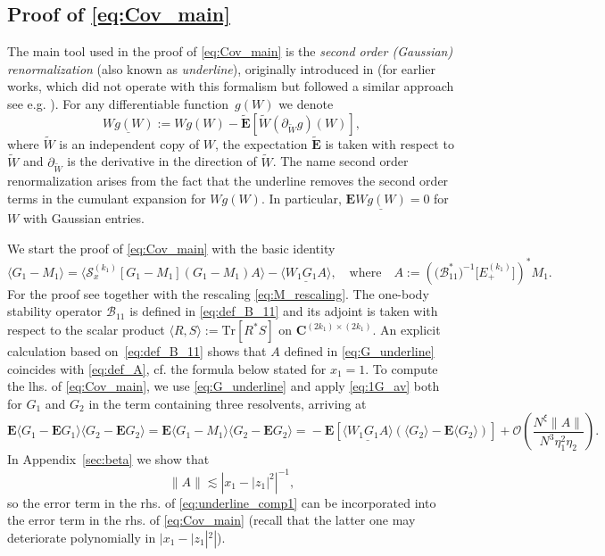 \documentclass[10pt]{amsart}
\numberwithin{equation}{section}
\newcommand{\E}{\mathbf{E}}
\newcommand{\C}{\mathbf{C}}
\begin{document}
\subsection{Proof of \eqref{eq:Cov_main}}\label{sec:Cov_underline}
The main tool used in the proof of \eqref{eq:Cov_main} is the \emph{second order (Gaussian) renormalization} (also known as \emph{underline}), originally introduced in \cite[Eq.(4.2)]{ETH_Wigner} (for earlier works, which did not operate with this formalism but followed a similar approach see e.g. \cite[Eq.(2.5)]{Knowles20}). For any differentiable function~$g(W)$ we denote
\begin{equation}
\underline{Wg(W)}:=Wg(W) - \widetilde{\E}\left[ \widetilde{W}\left(\partial_{\widetilde{W}}g\right)(W)\right],
\label{eq:def_under_1}
\end{equation} 
where $\widetilde{W}$ is an independent copy of $W$, the expectation $\widetilde{\E}$ is taken with respect to $\widetilde{W}$ and $\partial_{\widetilde{W}}$ is the derivative in the direction of $\widetilde{W}$. The name second order renormalization arises from the fact that the underline removes the second order terms in the cumulant expansion for $Wg(W)$. In particular, $\E\underline{Wg(W)}=0$ for $W$ with Gaussian entries.

We start the proof of \eqref{eq:Cov_main} with the basic identity
\begin{equation}
\langle G_1-M_1\rangle = \langle \mathcal{S}^{(k_1)}_x[G_1-M_1](G_1-M_1)A\rangle - \langle \underline{W_1G_1A}\rangle,\quad\text{where}\quad A:=\left(\big(\mathcal{B}_{11}^*\big)^{-1}\big[E_+^{(k_1)}\big]\right)^*M_1.
\label{eq:G_underline}
\end{equation}
For the proof see \cite[Eq.(6.9)]{macroCLT_complex} together with the rescaling \eqref{eq:M_rescaling}. The one-body stability operator $\mathcal{B}_{11}$ is defined in \eqref{eq:def_B_11} and its adjoint is taken with respect to the scalar product $\langle R,S\rangle:=\mathrm{Tr}[R^*S]$ on $\C^{(2k_1)\times (2k_1)}$. An explicit calculation based on~\eqref{eq:def_B_11} shows that $A$ defined in \eqref{eq:G_underline} coincides with \eqref{eq:def_A}, cf. the formula below \cite[Eq.(3.39)]{hyperuniformity} stated for $x_1=1$. To compute the lhs. of \eqref{eq:Cov_main}, we use \eqref{eq:G_underline} and apply \eqref{eq:1G_av} both for $G_1$ and $G_2$ in the term containing three resolvents, arriving at
\begin{equation}
\E \langle G_1-\E G_1\rangle \langle G_2-\E G_2\rangle\!=\! \E \langle G_1-M_1\rangle \langle G_2-\E G_2\rangle\!=\! -\E\left[\langle\underline{W_1G_1A}\rangle \left(\langle G_2\rangle -\E \langle G_2\rangle\right)\right] + \mathcal{O} \left(\frac{N^\xi\|A\|}{N^3\eta_1^2\eta_2}\right)\!. 
\label{eq:underline_comp1}
\end{equation}
In Appendix~\ref{sec:beta} we show that
\begin{equation}
\|A\|\lesssim \left\vert x_1-|z_1|^2\right\vert^{-1},
\label{eq:A_bound}
\end{equation}
so the error term in the rhs. of \eqref{eq:underline_comp1} can be incorporated into the error term in the rhs. of \eqref{eq:Cov_main} (recall that the latter one may deteriorate polynomially in $|x_1-|z_1|^2|$).
\end{document}
